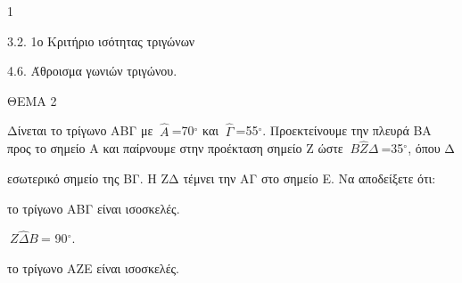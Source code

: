 \begin{ylh}{1}
    \item 3.2. 1ο Κριτήριο ισότητας τριγώνων
    \item 4.6. Άθροισμα γωνιών τριγώνου.
\end{ylh}

ΘΕΜΑ 2

Δίνεται το τρίγωνο ΑΒΓ με $\ \widehat{Α}\ $=70${^\circ}$ και $\ \widehat{\Gamma}\ $=55${^\circ}$. Προεκτείνουμε την πλευρά ΒΑ προς το σημείο Α και παίρνουμε στην προέκταση σημείο Ζ ώστε $\ Β\widehat{Ζ}\Delta\ $=35${^\circ}$, όπου Δ

εσωτερικό σημείο της ΒΓ. Η ΖΔ τέμνει την ΑΓ στο σημείο Ε. Να αποδείξετε ότι:

\begin{alist}
\item το τρίγωνο ΑΒΓ είναι ισοσκελές. 

\item $\ Ζ\widehat{\Delta}Β\ $= 90${^\circ}$. 

\item το τρίγωνο ΑΖΕ είναι ισοσκελές. 


\begin{center}
\end{center}
\end{alist}
